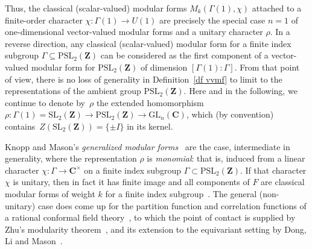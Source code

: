 \documentclass[10pt]{amsart}
\def\PSL{\mathrm{PSL}}
\def\Z{\mathbf{Z}}
\def\GL{\mathrm{GL}}
\theoremstyle{remark}
\numberwithin{equation}{subsection}
\def\C{\mathbf{C}}
\def\SL{\mathrm{SL}}
\begin{document}
Thus, the classical (scalar-valued) modular forms  $M_k(\Gamma(1), \chi)$ attached to a finite-order character $\chi : \Gamma(1) \to U(1)$ are precisely the special case $n = 1$ of one-dimensional vector-valued modular forms and a unitary character $\rho$.  In a reverse direction, any classical (scalar-valued) modular form for a finite index subgroup $\Gamma \subseteq \PSL_2(\Z)$ can be considered as the first component of a vector-valued modular form for $\PSL_2(\Z)$ of dimension $[\Gamma(1):\Gamma]$. From that point of view, there is no loss of generality in Definition~\ref{df vvmf} to limit to the representations of the ambient group $\PSL_2(\Z)$. Here and in the following, we continue to denote by~$\rho$ the extended homomorphism~$\rho : \Gamma(1) = \SL_2(\Z) \to \PSL_2(\Z) \to \GL_n(\C)$, which (by convention) contains~$Z(\SL_2(\Z)) = \{\pm I\}$ in its kernel. 

Knopp and Mason's \emph{generalized modular forms}~\cite{KnoppMason} are the case, intermediate in generality, where the representation $\rho$ is \emph{monomial}: that is, induced from a linear character $\chi : \Gamma \to \C^{\times}$ on a finite index subgroup  $\Gamma \subset \PSL_2(\Z)$. 
If that character $\chi$ is unitary, then in fact it has finite image and all components of $F$ are classical modular forms of weight $k$ for a finite index subgroup~\cite{KnoppMason}. The general (non-unitary) case does come up for the partition function and correlation functions of a rational conformal field theory~\cite{KnoppMason}, to which the point of contact is supplied by  Zhu's modularity theorem~\cite{Zhu}, 
 and its extension to the equivariant setting by Dong, Li and Mason~\cite{DongLiMason}.  
\end{document}
